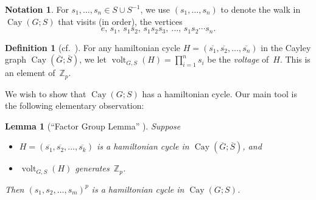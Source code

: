 \documentclass[]{amcjoucc}
\theoremstyle{plain}
\newtheorem{FGL}[equation]{Lemma}
\theoremstyle{definition}
\newtheorem{notation}[equation]{Notation}
\newtheorem{defn}[equation]{Definition}
\theoremstyle{definition}
\DeclareMathOperator{\Cay}{Cay}
\DeclareMathOperator{\volt}{volt}
\newcommand{\quot}{\overline}
\newcommand{\ZZ}{\mathbb{Z}}
\begin{document}
\begin{notation}
For $s_1,\ldots,s_n \in S \cup S^{-1}$, we use $(s_1,\ldots,s_n)$ to denote the walk in $\Cay(G;S)$ that visits (in order), the vertices
	$$ e, \, s_1, \ s_1 s_2, \, s_1 s_2 s_3, \ \ldots, \, s_1s_2\cdots s_n .$$
\end{notation}

\begin{defn}[cf.\ {\cite[\S2.1.3, p.~61]{GrossTucker-TopGraphThy}}]
For any hamiltonian cycle $H = (\quot{s_1},\quot{s_2},\ldots,\quot{s_n})$ in the Cayley graph $\Cay(\quot G; \quot S)$, we let $\volt_{G,S}(H) = \prod_{i=1}^n s_i$ be the \emph{voltage} of~$H$.
This is an element of~$\ZZ_p$.
\end{defn}

We wish to show that $\Cay(G;S)$ has a hamiltonian cycle. 
Our main tool is the following elementary observation:

\begin{FGL}[``Factor Group Lemma'' {\cite[\S2.2]{WitteGallian-survey}}] \label{FGL}
Suppose
 \begin{itemize}
 \item $H = (\quot{s_1}, \quot{s_2}, \ldots, \quot{s_k})$ is a hamiltonian cycle in $\Cay(\quot G; \quot S)$,
 and
 \item $\volt_{G,S}(H)$ generates~$\ZZ_p$.
 \end{itemize}
 Then $(s_1,s_2,\ldots,s_m)^p$ is a hamiltonian cycle in $\Cay(G;S)$.
 \end{FGL}
\end{document}
